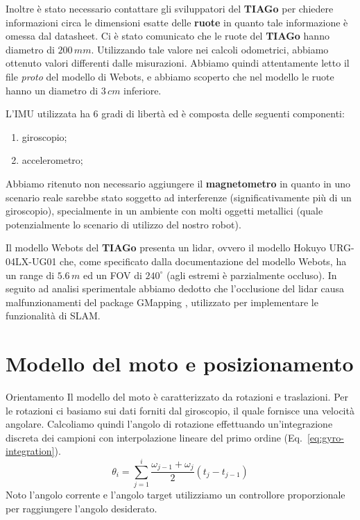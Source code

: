 \documentclass[10pt]{beamer}
\begin{document}
	Inoltre è stato necessario contattare gli sviluppatori del \textbf{TIAGo}
	per chiedere informazioni circa le dimensioni esatte delle \textbf{ruote}
	in quanto tale informazione è omessa dal datasheet. Ci è stato comunicato
	che le ruote del \textbf{TIAGo} hanno diametro di $200\,mm$. Utilizzando
	tale valore nei calcoli odometrici, abbiamo ottenuto valori differenti
	dalle misurazioni. Abbiamo quindi attentamente letto il file \textit{proto}
	del modello di Webots, e abbiamo scoperto che nel modello le ruote hanno un
	diametro di $3\,cm$ inferiore. 
	
    L'IMU utilizzata ha 6 gradi di libertà ed è composta delle seguenti componenti:
	\begin{enumerate}
		\item giroscopio;	
		\item accelerometro;
	\end{enumerate}
	Abbiamo ritenuto non necessario aggiungere il \textbf{magnetometro} in quanto in uno scenario reale sarebbe stato soggetto ad interferenze (significativamente più di un giroscopio), specialmente in un ambiente con molti oggetti metallici (quale potenzialmente lo scenario di utilizzo del nostro robot).
	
	Il modello Webots del \textbf{TIAGo} presenta un lidar, ovvero il modello Hokuyo URG-04LX-UG01 \cite{lidarspecs} che, come specificato dalla documentazione del modello Webots,  ha un range di $5.6\,m$ ed un FOV di $240^{\circ}$ (agli estremi è parzialmente occluso). In seguito ad analisi sperimentale abbiamo dedotto che l'occlusione del lidar causa malfunzionamenti del package GMapping \cite{grisettiyz2005improving}, utilizzato per implementare le funzionalità di SLAM.

	\section{Modello del moto e posizionamento}\label{sec:Modello-del-moto-e-posizionamento} 
	\frame{\sectionpage}
	\begin{frame}{Orientamento}
		Il modello del moto è caratterizzato da rotazioni e traslazioni. Per le
		rotazioni ci basiamo sui dati forniti dal giroscopio, il quale fornisce
		una velocità angolare. Calcoliamo quindi l'angolo di rotazione
		effettuando un'integrazione discreta dei campioni con interpolazione
		lineare del primo ordine (Eq.~\ref{eq:gyro-integration}).  
		\begin{equation}\label{eq:gyro-integration}
			\theta_i = \sum_{j=1}^i \frac{\omega _{j-1}+\omega _j}{2} \left( t_j-t_{j-1} \right) 
		\end{equation}
		Noto l'angolo corrente e l'angolo target utilizziamo un controllore
		proporzionale per raggiungere l'angolo desiderato.
	\end{frame}
	
\end{document}
